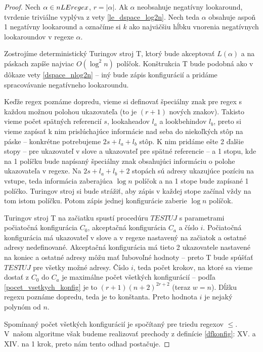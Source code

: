 \begin{proof}
Nech $\alpha\in nLEregex$, $r=|\alpha|$. Ak $\alpha$ neobsahuje negatívny lookaround, tvrdenie triviálne vyplýva z vety \ref{le_dspace_log2n}. Nech teda $\alpha$ obsahuje aspoň 1 negatívny lookaround a označíme si $k$ ako najväčšiu hĺbku vnorenia negatívnych lookaroundov v regexe $\alpha$.

Zostrojíme deterministický Turingov stroj T, ktorý bude akceptovať $L(\alpha)$ a na páskach zapíše najviac $O(\log^2 n)$ políčok. Konštrukcia T bude podobná ako v dôkaze vety \ref{dspace_nlog2n} -- iný bude zápis konfigurácií a pridáme spracovávanie negatívneho lookaroundu.

Keďže regex poznáme dopredu, vieme si definovať špeciálny znak pre regex s každou možnou polohou ukazovateľa (to je $(r+1)$ nových znakov). Takisto vieme počet spätných referencií $s$, lookaheadov $l_a$ a lookbehindov $l_b$, preto si vieme zapísať k nim prislúchajúce informácie nad seba do niekoľkých stôp na páske -- konkrétne potrebujeme $2s+l_a+l_b$ stôp. K nim pridáme ešte 2 ďalšie stopy -- pre ukazovateľ v slove a ukazovateľ pre spätné referencie -- a 1 stopu, kde na 1 políčku bude napísaný špeciálny znak obsahujúci informáciu o polohe ukazovateľa v regexe. Na $2s+l_a+l_b+2$ stopách sú adresy ukazujúce pozíciu na vstupe, teda informácia zaberajúca $\log n$ políčok a na 1 stope bude zapísané 1 políčko. Turingov stroj si bude strážiť, aby zápis v každej stope začínal vždy na tom istom políčku. Potom zápis jednej konfigurácie zaberie $\log n$ políčok.

Turingov stroj T na začiatku spustí procedúru $TESTUJ$ s parametrami počiatočná konfigurácia $C_0$, akceptačná konfigurácia $C_a$ a číslo $i$. Počiatočná konfigurácia má ukazovateľ v slove a v regexe nastavený na začiatok a ostatné adresy nedefinované. Akceptačná konfigurácia má tieto 2 ukazovatele nastavené na koniec a ostatné adresy môžu mať ľubovoľné hodnoty -- preto T bude spúšťať $TESTUJ$ pre všetky možné adresy. Číslo $i$, teda počet krokov, na ktoré sa vieme dostať z $C_0$ do $C_a$ je maximálne počet všetkých konfigurácií -- podľa \ref{pocet_vsetkych_konfig} je to $(r+1)(n+2)^{2r+2}$ (teraz $w=n$). Dĺžku regexu poznáme dopredu, teda je to konštanta. Preto hodnota $i$ je nejaký polynóm od $n$.

Spomínaný počet všetkých konfigurácií je spočítaný pre triedu regexov $\le$. V~našom algoritme však budeme realizovať prechody z definície \ref{dfkonfig}: XV. a XIV. na 1 krok, preto nám tento odhad postačuje.


\end{proof}
